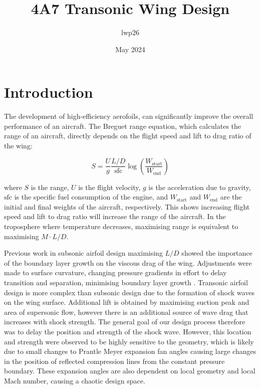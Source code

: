 \documentclass[11pt]{article}
\begin{document}
\title{4A7 Transonic Wing Design}
\author{lwp26}
\date{May 2024}
\maketitle

\section{Introduction}


The development of high-efficiency aerofoils, can significantly improve the overall performance of an aircraft.
The Breguet range equation, which calculates the range of an aircraft, directly depends on the flight speed and lift to drag ratio of the wing:

\begin{equation}
S = \frac{U}{g}\frac{L/D}{\text{sfc}} \log \left( \frac{W_\text{start}}{W_\text{end}} \right)
\end{equation}

where $S$ is the range, $U$ is the flight velocity, $g$ is the acceleration due to gravity, $\text{sfc}$ is the specific fuel consumption of the engine, and $W_\text{start}$ and $W_\text{end}$ are the initial and final weights of the aircraft, respectively.
This shows increasing flight speed and lift to drag ratio will increase the range of the aircraft.
In the troposphere where temperature decreases, maximising range is equivalent to maximising $M \cdot L/D$.

Previous work in subsonic airfoil design maximising $L/D$ showed the importance of the boundary layer growth on the viscous drag of the wing.
Adjustments were made to surface curvature, changing pressure gradients in effort to delay transition and separation, minimising boundary layer growth \cite{SA1_report}.
Transonic airfoil design is more complex than subsonic design due to the formation of shock waves on the wing surface.
Additional lift is obtained by maximising suction peak and area of supersonic flow, however there is an additional source of wave drag that increases with shock strength.
The general goal of our design process therefore was to delay the position and strength of the shock wave.
However, this location and strength were observed to be highly sensitive to the geometry, which is likely due to small changes to Prantle Meyer
expansion fan angles causing large changes in the position of reflected compression lines from the constant pressure boundary.
These expansion angles are also dependent on local geometry and local Mach number, causing a chaotic design space.
 
\end{document}
